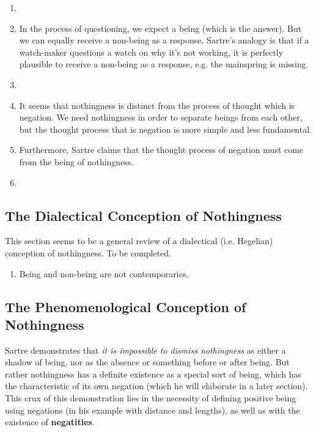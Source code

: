 \begin{enumerate}
  \item {}
  \item In the process of questioning, we expect a being (which is the answer). But we can equally receive a non-being as a response. Sartre's analogy is that if a watch-maker questions a watch on why it's not working, it is perfectly plausible to receive a non-being as a response, e.g. the mainspring is missing.
  \item {} 
  \item It seems that nothingness is distinct from the process of thought which is negation. We need nothingness in order to separate beings from each other, but the thought process that is negation is more simple and less fundamental.
  \item Furthermore, Sartre claims that the thought process of negation must come from the being of nothingness.
  \item {}
\end{enumerate}

\subsection{The Dialectical Conception of Nothingness}
This section seems to be a general review of a dialectical (i.e. Hegelian) conception of nothingness. To be completed.

\begin{enumerate}
  \item Being and non-being are not contemporaries.
\end{enumerate}

\subsection{The Phenomenological Conception of Nothingness}

Sartre demonstrates that \emph{it is impossible to dismiss nothingness} as either a shadow of being, nor as the absence or something before or after being. But rather nothingness has a definite existence as a special sort of being, which has the characteristic of its own negation (which he will elaborate in a later section). This crux of this demonstration lies in the necessity of defining positive being using negations (in his example with distance and lengths), as well as with the existence of \textbf{negatities}.

